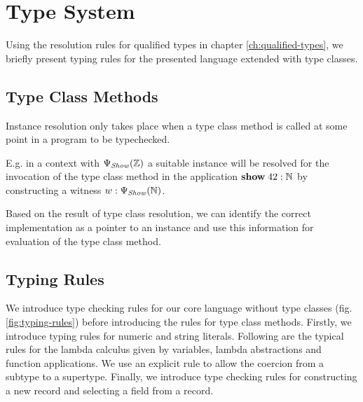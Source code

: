\chapter{Type System}
\label{ch:type-system}

Using the resolution rules for qualified types in chapter \ref{ch:qualified-types}, we briefly present typing rules for the presented language extended with type classes.

\section{Type Class Methods}

Instance resolution only takes place when a type class method is called at some point in a program to be typechecked.

E.g. in a context with $\Psi_\mathit{Show}(\mathbb{Z})$ a suitable instance will be resolved for the invocation of the type class method in the application ${\bf show} \; 42 : \mathbb{N}$
by constructing a witness $w : \Psi_\mathit{Show}(\mathbb{N})$.

Based on the result of type class resolution, we can identify the correct implementation as a pointer to an instance and use this information for evaluation of the type class method.


\section{Typing Rules}

We introduce type checking rules for our core language without type classes (fig. \ref{fig:typing-rules}) before introducing the rules for type class methods.
Firstly, we introduce typing rules for numeric and string literals.
Following are the typical rules for the lambda calculus given by variables, lambda abstractions and function applications.
We use an explicit rule to allow the coercion from a subtype to a supertype.
Finally, we introduce type checking rules for constructing a new record and selecting a field from a record.

